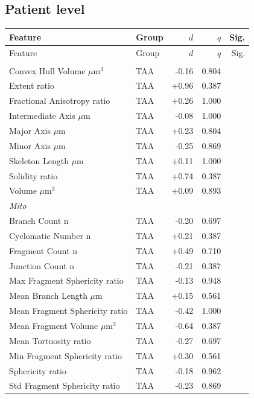 \documentclass[11pt,a4paper]{article}
\begin{document}
\subsection*{Patient level}
\begin{longtable}{llrrr}
\toprule
Feature & Group & $d$ & $q$ & Sig. \\
\midrule\endfirsthead
\toprule Feature & Group & $d$ & $q$ & Sig. \\\midrule\endhead
\bottomrule\endfoot
\multicolumn{5}{l}{\textit{Actin}} \\
  Convex Hull Volume $\mu$m$^{3}$ & TAA & -0.16 & 0.804 &  \\
  Extent ratio & TAA & +0.96 & 0.387 &  \\
  Fractional Anisotropy ratio & TAA & +0.26 & 1.000 &  \\
  Intermediate Axis $\mu$m & TAA & -0.08 & 1.000 &  \\
  Major Axis $\mu$m & TAA & +0.23 & 0.804 &  \\
  Minor Axis $\mu$m & TAA & -0.25 & 0.869 &  \\
  Skeleton Length $\mu$m & TAA & +0.11 & 1.000 &  \\
  Solidity ratio & TAA & +0.74 & 0.387 &  \\
  Volume $\mu$m$^{3}$ & TAA & +0.09 & 0.893 &  \\
\midrule
\multicolumn{5}{l}{\textit{Mito}} \\
  Branch Count n & TAA & -0.20 & 0.697 &  \\
  Cyclomatic Number n & TAA & +0.21 & 0.387 &  \\
  Fragment Count n & TAA & +0.49 & 0.710 &  \\
  Junction Count n & TAA & -0.21 & 0.387 &  \\
  Max Fragment Sphericity ratio & TAA & -0.13 & 0.948 &  \\
  Mean Branch Length $\mu$m & TAA & +0.15 & 0.561 &  \\
  Mean Fragment Sphericity ratio & TAA & -0.42 & 1.000 &  \\
  Mean Fragment Volume $\mu$m$^{3}$ & TAA & -0.64 & 0.387 &  \\
  Mean Tortuosity ratio & TAA & -0.27 & 0.697 &  \\
  Min Fragment Sphericity ratio & TAA & +0.30 & 0.561 &  \\
  Sphericity ratio & TAA & -0.18 & 0.962 &  \\
  Std Fragment Sphericity ratio & TAA & -0.23 & 0.869 &  \\

\end{longtable}
\end{document}
